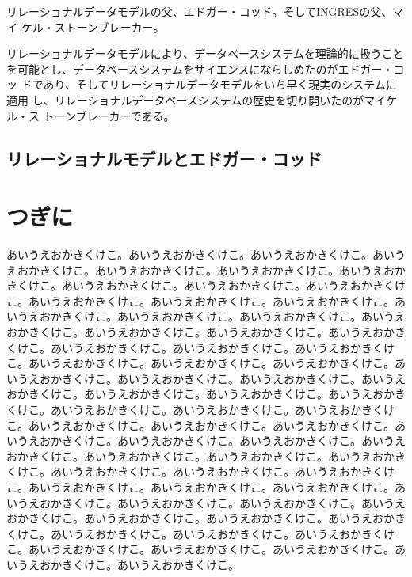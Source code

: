 リレーショナルデータモデルの父、エドガー・コッド。そしてINGRESの父、マイ
ケル・ストーンブレーカー。

リレーショナルデータモデルにより、データベースシステムを理論的に扱うこと
を可能とし、データベースシステムをサイエンスにならしめたのがエドガー・コッ
ドであり、そしてリレーショナルデータモデルをいち早く現実のシステムに適用
し、リレーショナルデータベースシステムの歴史を切り開いたのがマイケル・ス
トーンブレーカーである。

\subsection{リレーショナルモデルとエドガー・コッド}



\section{つぎに}

\lettrine{あ}
いうえおかきくけこ。あいうえおかきくけこ。あいうえおかきくけこ。あいうえおかきくけこ。あいうえおかきくけこ。あいうえおかきくけこ。あいうえおかきくけこ。あいうえおかきくけこ。あいうえおかきくけこ。あいうえおかきくけこ。あいうえおかきくけこ。あいうえおかきくけこ。あいうえおかきくけこ。あいうえおかきくけこ。あいうえおかきくけこ。あいうえおかきくけこ。あいうえおかきくけこ。あいうえおかきくけこ。あいうえおかきくけこ。あいうえおかきくけこ。あいうえおかきくけこ。あいうえおかきくけこ。あいうえおかきくけこ。あいうえおかきくけこ。あいうえおかきくけこ。あいうえおかきくけこ。あいうえおかきくけこ。あいうえおかきくけこ。あいうえおかきくけこ。あいうえおかきくけこ。あいうえおかきくけこ。あいうえおかきくけこ。あいうえおかきくけこ。あいうえおかきくけこ。あいうえおかきくけこ。あいうえおかきくけこ。あいうえおかきくけこ。あいうえおかきくけこ。あいうえおかきくけこ。あいうえおかきくけこ。あいうえおかきくけこ。あいうえおかきくけこ。あいうえおかきくけこ。あいうえおかきくけこ。あいうえおかきくけこ。あいうえおかきくけこ。あいうえおかきくけこ。あいうえおかきくけこ。あいうえおかきくけこ。あいうえおかきくけこ。あいうえおかきくけこ。あいうえおかきくけこ。あいうえおかきくけこ。あいうえおかきくけこ。あいうえおかきくけこ。あいうえおかきくけこ。あいうえおかきくけこ。あいうえおかきくけこ。あいうえおかきくけこ。あいうえおかきくけこ。あいうえおかきくけこ。あいうえおかきくけこ。あいうえおかきくけこ。あいうえおかきくけこ。あいうえおかきくけこ。あいうえおかきくけこ。あいうえおかきくけこ。